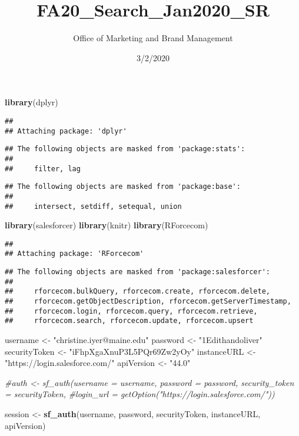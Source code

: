 \documentclass[
]{article}
\title{FA20\_Search\_Jan2020\_SR}
\author{Office of Marketing and Brand Management}
\date{3/2/2020}
\newenvironment{Shaded}{\begin{snugshade}}{\end{snugshade}}
\newcommand{\CommentTok}[1]{\textcolor[rgb]{0.56,0.35,0.01}{\textit{#1}}}
\newcommand{\KeywordTok}[1]{\textcolor[rgb]{0.13,0.29,0.53}{\textbf{#1}}}
\newcommand{\NormalTok}[1]{#1}
\newcommand{\StringTok}[1]{\textcolor[rgb]{0.31,0.60,0.02}{#1}}
\begin{document}
\maketitle

\begin{Shaded}
\begin{Highlighting}[]
\KeywordTok{library}\NormalTok{(dplyr)}
\end{Highlighting}
\end{Shaded}

\begin{verbatim}
## 
## Attaching package: 'dplyr'
\end{verbatim}

\begin{verbatim}
## The following objects are masked from 'package:stats':
## 
##     filter, lag
\end{verbatim}

\begin{verbatim}
## The following objects are masked from 'package:base':
## 
##     intersect, setdiff, setequal, union
\end{verbatim}

\begin{Shaded}
\begin{Highlighting}[]
\KeywordTok{library}\NormalTok{(salesforcer)}
\KeywordTok{library}\NormalTok{(knitr)}
\KeywordTok{library}\NormalTok{(RForcecom)}
\end{Highlighting}
\end{Shaded}

\begin{verbatim}
## 
## Attaching package: 'RForcecom'
\end{verbatim}

\begin{verbatim}
## The following objects are masked from 'package:salesforcer':
## 
##     rforcecom.bulkQuery, rforcecom.create, rforcecom.delete,
##     rforcecom.getObjectDescription, rforcecom.getServerTimestamp,
##     rforcecom.login, rforcecom.query, rforcecom.retrieve,
##     rforcecom.search, rforcecom.update, rforcecom.upsert
\end{verbatim}

\begin{Shaded}
\begin{Highlighting}[]
\NormalTok{username <-}\StringTok{ "christine.iyer@maine.edu"}
\NormalTok{password <-}\StringTok{ "1Edithandoliver"}
\NormalTok{securityToken <-}\StringTok{ "iFhpXgaXnuP3L5PQr69Zw2yOy"}
\NormalTok{instanceURL <-}\StringTok{ "https://login.salesforce.com/"}
\NormalTok{apiVersion <-}\StringTok{ "44.0"}

\CommentTok{#auth <- sf_auth(username = username, password = password, security_token = securityToken,}
  \CommentTok{#login_url = getOption("https://login.salesforce.com/"))}



\NormalTok{session <-}\StringTok{ }\KeywordTok{sf_auth}\NormalTok{(username, password, securityToken, instanceURL, apiVersion)}
\end{Highlighting}
\end{Shaded}
\end{document}
